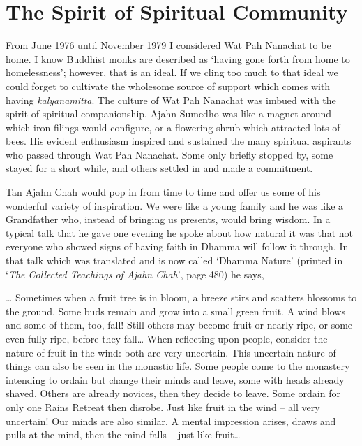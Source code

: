 \chapter{The Spirit of Spiritual Community}

From June 1976 until November 1979 I considered Wat Pah Nanachat to be
home. I know Buddhist monks are described as `having gone forth from
home to homelessness'; however, that is an ideal. If we cling too much
to that ideal we could forget to cultivate the wholesome source of
support which comes with having \emph{kalyanamitta}. The culture of Wat
Pah Nanachat was imbued with the spirit of spiritual companionship.
Ajahn Sumedho was like a magnet around which iron filings would
configure, or a flowering shrub which attracted lots of bees. His
evident enthusiasm inspired and sustained the many spiritual aspirants
who passed through Wat Pah Nanachat. Some only briefly stopped by, some
stayed for a short while, and others settled in and made a commitment.

Tan Ajahn Chah would pop in from time to time and offer us some of his
wonderful variety of inspiration. We were like a young family and he was
like a Grandfather who, instead of bringing us presents, would bring
wisdom. In a typical talk that he gave one evening he spoke about how
natural it was that not everyone who showed signs of having faith in
Dhamma will follow it through. In that talk which was translated and is
now called `Dhamma Nature' (printed in
`\emph{The Collected Teachings of Ajahn Chah}\cite{collected}', page 480)
he says,

\ldots{} Sometimes when a fruit tree is in bloom, a breeze stirs and
scatters blossoms to the ground. Some buds remain and grow into a small
green fruit. A wind blows and some of them, too, fall! Still others may
become fruit or nearly ripe, or some even fully ripe, before they
fall\ldots{} When reflecting upon people, consider the nature of fruit in
the wind: both are very uncertain. This uncertain nature of things can
also be seen in the monastic life. Some people come to the monastery
intending to ordain but change their minds and leave, some with heads
already shaved. Others are already novices, then they decide to leave.
Some ordain for only one Rains Retreat then disrobe. Just like fruit in
the wind -- all very uncertain! Our minds are also similar. A mental
impression arises, draws and pulls at the mind, then the mind falls --
just like fruit\ldots{}

